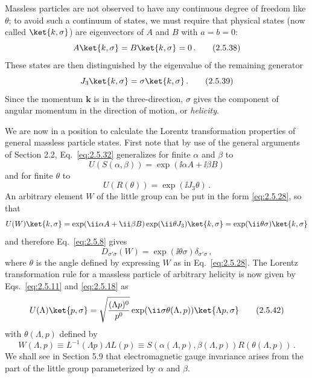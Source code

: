 Massless particles are not observed to have any continuous degree of freedom
like $\theta$; to avoid such a continuum of states, we must require that
physical states (now called $\ket{k,\sigma}$) are eigenvectors of $A$ and $B$
with $a=b=0$:
\begin{equation}
A\ket{k,\sigma}=B\ket{k,\sigma}=0\,.
\tag{2.5.38}\label{eq:2.5.38}
\end{equation}
These states are then distinguished by the eigenvalue of the remaining
generator
\begin{equation}
J_3\ket{k,\sigma}=\sigma\ket{k,\sigma}\,.
\tag{2.5.39}\label{eq:2.5.39}
\end{equation}
Since the momentum $\mathbf{k}$ is in the three-direction, $\sigma$ gives the
component of angular momentum in the direction of motion, or \emph{helicity}.

We are now in a position to calculate the Lorentz transformation properties of
general massless particle states. First note that by use of the general
arguments of Section 2.2, Eq.~\eqref{eq:2.5.32} generalizes for finite $\alpha$ and
$\beta$ to
\begin{equation}
U(S(\alpha,\beta))=\exp(\ii\alpha A+\ii\beta B)
\tag{2.5.40}\label{eq:2.5.40}
\end{equation}
and for finite $\theta$ to
\begin{equation}
U(R(\theta))=\exp(\ii J_3\theta)\,.
\tag{2.5.41}\label{eq:2.5.41}
\end{equation}
An arbitrary element $W$ of the little group can be put in the form \eqref{eq:2.5.28},
so that
\[
U(W)\ket{k,\sigma}
=\exp(\ii\alpha A+\ii\beta B)\exp(\ii\theta J_3)\ket{k,\sigma}
=\exp(\ii\theta\sigma)\ket{k,\sigma}
\]
and therefore Eq.~\eqref{eq:2.5.8} gives
\[
D_{\sigma'\sigma}(W)=\exp(\ii\theta\sigma)\delta_{\sigma'\sigma}\,,
\]
where $\theta$ is the angle defined by expressing $W$ as in Eq.~\eqref{eq:2.5.28}. The
Lorentz transformation rule for a massless particle of arbitrary helicity is
now given by Eqs.~\eqref{eq:2.5.11} and \eqref{eq:2.5.18} as
\begin{equation}
U(\Lambda)\ket{p,\sigma}
=\sqrt{\frac{(\Lambda p)^0}{p^0}}
\exp(\ii\sigma\theta(\Lambda,p))\ket{\Lambda p,\sigma}
\tag{2.5.42}\label{eq:2.5.42}
\end{equation}
with $\theta(\Lambda,p)$ defined by
\begin{equation}
W(\Lambda,p)\equiv L^{-1}(\Lambda p)\Lambda L(p)
\equiv S(\alpha(\Lambda,p),\beta(\Lambda,p))R(\theta(\Lambda,p))\,.
\tag{2.5.43}\label{eq:2.5.43}
\end{equation}
We shall see in Section 5.9 that electromagnetic gauge invariance arises from
the part of the little group parameterized by $\alpha$ and $\beta$.

